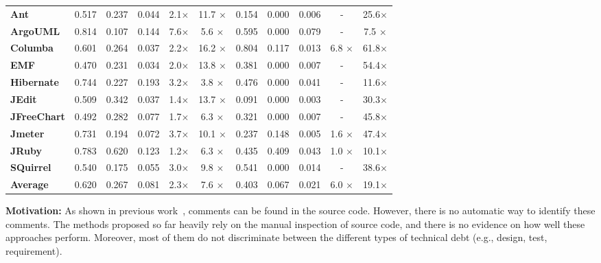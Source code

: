 \begin{table}[!thb]
\begin{center}
\begin{tabular}{l| c c c c c| c c c c c}
        \midrule                                                  
        \textbf{Ant}       &0.517&0.237&0.044&2.1$\times$& 11.7 $\times$&0.154&0.000&0.006&-             & 25.6$\times$  \\
        \textbf{ArgoUML}   &0.814&0.107&0.144&7.6$\times$& 5.6  $\times$&0.595&0.000&0.079&-             & 7.5 $\times$  \\
        \textbf{Columba}   &0.601&0.264&0.037&2.2$\times$& 16.2 $\times$&0.804&0.117&0.013&6.8  $\times$ & 61.8$\times$  \\
        \textbf{EMF}       &0.470&0.231&0.034&2.0$\times$& 13.8 $\times$&0.381&0.000&0.007&-             & 54.4$\times$  \\
        \textbf{Hibernate} &0.744&0.227&0.193&3.2$\times$& 3.8  $\times$&0.476&0.000&0.041&-             & 11.6$\times$  \\
        \textbf{JEdit}     &0.509&0.342&0.037&1.4$\times$& 13.7 $\times$&0.091&0.000&0.003&-             & 30.3$\times$  \\
        \textbf{JFreeChart}&0.492&0.282&0.077&1.7$\times$& 6.3  $\times$&0.321&0.000&0.007&-             & 45.8$\times$  \\
        \textbf{Jmeter}    &0.731&0.194&0.072&3.7$\times$& 10.1 $\times$&0.237&0.148&0.005&1.6 $\times$  & 47.4$\times$  \\
        \textbf{JRuby}     &0.783&0.620&0.123&1.2$\times$& 6.3  $\times$&0.435&0.409&0.043&1.0 $\times$  & 10.1$\times$  \\
        \textbf{SQuirrel}  &0.540&0.175&0.055&3.0$\times$& 9.8  $\times$&0.541&0.000&0.014&-             & 38.6$\times$  \\
        \midrule 
        \textbf{Average}   &0.620&0.267&0.081&2.3$\times$&7.6   $\times$&0.403&0.067&0.021&6.0 $\times$  & 19.1$\times$ \\ 
        \bottomrule
        \end{tabular}
    \end{center}    
\end{table}

\vspace{3mm}
\noindent\rqi
\vspace{3mm}

\noindent \textbf{Motivation:} As shown in previous work~\cite{Maldonado2015MTD}, \SATD comments can be found in the source code. However, there is no automatic way to identify these comments. The methods proposed so far heavily rely on the manual inspection of source code, and there is no evidence on how well these approaches perform. Moreover, most of them do not discriminate between the different types of technical debt (e.g., design, test, requirement).

